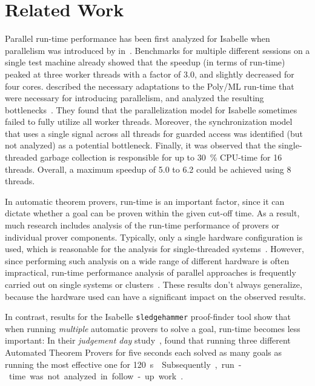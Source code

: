 
\section{Related Work}\label{sec:related}
Parallel run-time performance has been first analyzed for Isabelle
when parallelism was introduced by \citeauthor{Parallel2009Wenzel} in~\cite{Parallel2009Wenzel}.
Benchmarks for multiple different sessions on a single test machine already showed
that the speedup
(in terms of run-time)
peaked at three worker threads with a factor of \num{3.0},
and slightly decreased for four cores.
\citeauthor{PolyParallel2010Matthews} described the necessary adaptations to the Poly/ML run-time
that were necessary for introducing parallelism,
and analyzed the resulting bottlenecks~\cite{PolyParallel2010Matthews}.
They found that the parallelization model for Isabelle sometimes failed to fully utilize all worker threads.
Moreover, the synchronization model that uses a single signal across all threads for guarded access
was identified (but not analyzed) as a potential bottleneck.
Finally, it was observed that the single-threaded garbage collection is responsible for up to \SI{30}{\percent} CPU-time for \num{16} threads.
Overall, a maximum speedup of \num{5.0} to \num{6.2} could be achieved
using \num{8} threads.

In automatic theorem provers, run-time is an important factor,
since it can dictate whether a goal can be proven within the given cut-off time.
As a result, much research includes analysis of the run-time performance of provers
or individual prover components.
Typically, only a single hardware configuration is used,
which is reasonable for the analysis for single-threaded systems~\cite{PerformanceESat2016Schulz}.
However, since performing such analysis on a wide range of different hardware is often impractical,
run-time performance analysis of parallel approaches
is frequently carried out on single systems or clusters~\cite{PerformanceOR1991Ertel,ParallelDeduction1992Jindal,ParallelHyper2001Wu}.
These results don't always generalize, because the hardware used can have a significant impact on the observed results.

In contrast, results for the Isabelle \texttt{sledgehammer} proof-finder tool show that when running \emph{multiple} automatic provers to solve a goal,
run-time becomes less important:
In their \emph{judgement day} study~\cite{Judgementday2010Boehme},
\citeauthor{Judgementday2010Boehme} found that running three different Automated Theorem Provers for five seconds each
solved as many goals as running the most effective one for \SI{120}\second{}.
Subsequently, run-time was not analyzed in follow-up work~\cite{SMTHammer2011Blanchette}.

